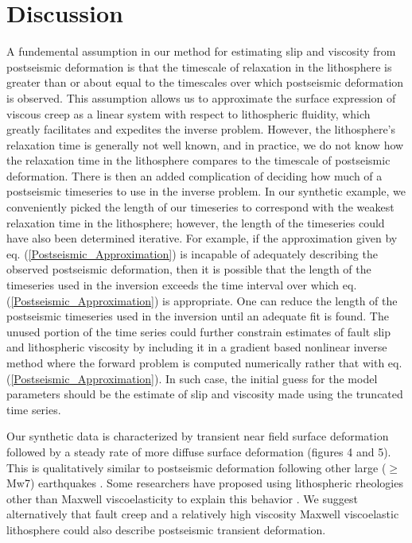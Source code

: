 \documentclass[extra]{gji}
\begin{document}
\section{Discussion}

A fundemental assumption in our method for estimating slip and
viscosity from postseismic deformation is that the timescale of
relaxation in the lithosphere is greater than or about equal to the
timescales over which postseismic deformation is observed.  This
assumption allows us to approximate the surface expression of viscous
creep as a linear system with respect to lithospheric fluidity, which
greatly facilitates and expedites the inverse problem.  However, the
lithosphere's relaxation time is generally not well known, and in
practice, we do not know how the relaxation time in the lithosphere
compares to the timescale of postseismic deformation.  There is then
an added complication of deciding how much of a postseismic timeseries
to use in the inverse problem.  In our synthetic example, we
conveniently picked the length of our timeseries to correspond with
the weakest relaxation time in the lithosphere; however, the length of
the timeseries could have also been determined iterative.  For
example, if the approximation given by
eq. (\ref{Postseismic_Approximation}) is incapable of adequately
describing the observed postseismic deformation, then it is possible
that the length of the timeseries used in the inversion exceeds the
time interval over which eq. (\ref{Postseismic_Approximation}) is
appropriate.  One can reduce the length of the postseismic timeseries
used in the inversion until an adequate fit is found. The unused
portion of the time series could further constrain estimates of fault
slip and lithospheric viscosity by including it in a gradient based
nonlinear inverse method where the forward problem is computed
numerically rather that with eq. (\ref{Postseismic_Approximation}). In
such case, the initial guess for the model parameters should be the
estimate of slip and viscosity made using the truncated time series.

Our synthetic data is characterized by transient near field surface
deformation followed by a steady rate of more diffuse surface
deformation (figures 4 and 5).  This is qualitatively similar to
postseismic deformation following other large ($\geq$ Mw7) earthquakes
\citep[e.g.][]{E2009}.  Some researchers have proposed using
lithospheric rheologies other than Maxwell viscoelasticity to explain
this behavior \citep[e.g.][]{HH2005,P2005,P2003,F2006b}. We suggest
alternatively that fault creep and a relatively high viscosity Maxwell
viscoelastic lithosphere could also describe postseismic transient
deformation.  
\end{document}
